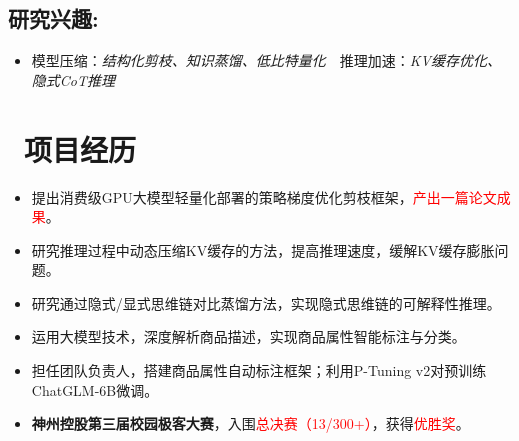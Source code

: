 \documentclass{resume}
\begin{document}
\vspace{-2mm}

\noindent
\subsection{\textbf{研究兴趣:}}
\begin{itemize}[nosep, leftmargin=*, topsep=0pt, partopsep=0pt]
      \item 模型压缩：\textit{结构化剪枝、知识蒸馏、低比特量化}\ \ 推理加速：\textit{KV缓存优化、隐式CoT推理}
\end{itemize}


\vspace{-1mm}
\section{\faTasks\ 项目经历}
\begin{itemize}
  \item 提出消费级GPU大模型轻量化部署的策略梯度优化剪枝框架，\textcolor{red}{产出一篇论文成果}。
  \item 研究推理过程中动态压缩KV缓存的方法，提高推理速度，缓解KV缓存膨胀问题。
  \item 研究通过隐式/显式思维链对比蒸馏方法，实现隐式思维链的可解释性推理。
\end{itemize}

\begin{itemize}
  \item 运用大模型技术，深度解析商品描述，实现商品属性智能标注与分类。
  \item 担任团队负责人，搭建商品属性自动标注框架；利用P-Tuning v2对预训练ChatGLM-6B微调。
  \item \textbf{神州控股第三届校园极客大赛}，入围\textcolor{red}{总决赛（13/300+）}，获得\textcolor{red}{优胜奖}。
\end{itemize}
\end{document}
